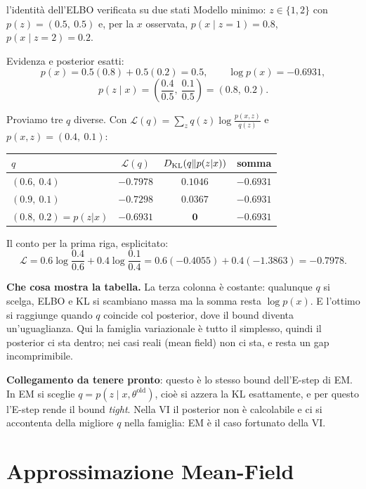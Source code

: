 \begin{esempiosvolto}{l'identità dell'ELBO verificata su due stati}
Modello minimo: $z \in \{1,2\}$ con $p(z) = (0.5,\ 0.5)$ e, per la $x$ osservata, $p(x \mid z{=}1) = 0.8$, $p(x \mid z{=}2) = 0.2$.

Evidenza e posterior esatti:
\[
p(x) = 0.5(0.8) + 0.5(0.2) = 0.5, \qquad \log p(x) = -0.6931,
\]
\[
p(z \mid x) = \left(\frac{0.4}{0.5},\ \frac{0.1}{0.5}\right) = (0.8,\ 0.2).
\]

Proviamo tre $q$ diverse. Con $\mathcal{L}(q) = \sum_z q(z) \log \frac{p(x,z)}{q(z)}$ e $p(x,z) = (0.4,\ 0.1)$:

\begin{center}
\begin{tabular}{lccc}
\toprule
$q$ & $\mathcal{L}(q)$ & $D_{\mathrm{KL}}\!\left(q \| p(z|x)\right)$ & somma \\
\midrule
$(0.6,\ 0.4)$ & $-0.7978$ & $0.1046$ & $-0.6931$ \\
$(0.9,\ 0.1)$ & $-0.7298$ & $0.0367$ & $-0.6931$ \\
$(0.8,\ 0.2) = p(z|x)$ & $\mathbf{-0.6931}$ & $\mathbf{0}$ & $-0.6931$ \\
\bottomrule
\end{tabular}
\end{center}

Il conto per la prima riga, esplicitato:
\[
\mathcal{L} = 0.6 \log\frac{0.4}{0.6} + 0.4 \log\frac{0.1}{0.4} = 0.6(-0.4055) + 0.4(-1.3863) = -0.7978.
\]

\textbf{Che cosa mostra la tabella.} La terza colonna è costante: qualunque $q$ si scelga, ELBO e KL si scambiano massa ma la somma resta $\log p(x)$. E l'ottimo si raggiunge quando $q$ coincide col posterior, dove il bound diventa un'uguaglianza. Qui la famiglia variazionale è tutto il simplesso, quindi il posterior ci sta dentro; nei casi reali (mean field) non ci sta, e resta un gap incomprimibile.

\textbf{Collegamento da tenere pronto}: questo è lo stesso bound dell'E-step di EM. In EM si sceglie $q = p(z \mid x, \theta^{\text{old}})$, cioè si azzera la KL esattamente, e per questo l'E-step rende il bound \emph{tight}. Nella VI il posterior non è calcolabile e ci si accontenta della migliore $q$ nella famiglia: EM è il caso fortunato della VI.
\end{esempiosvolto}

\section{Approssimazione Mean-Field}

